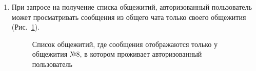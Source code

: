 \documentclass{../includes/TechDoc}
\begin{document}
\begin{enumerate}
        \item При запросе на получение списка общежитий, авторизованный пользователь может просматривать
        сообщения из общего чата только своего общежития (Рис.~\ref{ris:api_dormitory_messages}).
        \begin{figure}[h]
            \centering
            \caption{Список общежитий, где сообщения отображаются только у общежития №8, в котором проживает авторизованный пользователь}
            \label{ris:api_dormitory_messages}
        \end{figure}


\end{enumerate}
\end{document}
